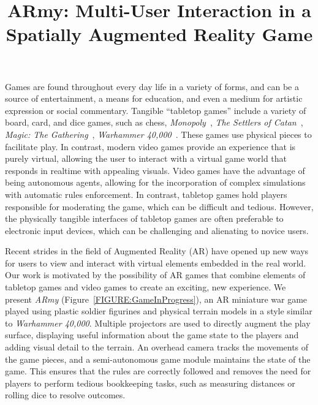 \documentclass[review]{vgtc}                 %
\title{ARmy: Multi-User Interaction in a Spatially Augmented Reality Game}
\begin{document}


\maketitle


Games are found throughout every day life in a variety of forms, and
can be a source of entertainment, a means for education, and even a
medium for artistic expression or social commentary.  Tangible
``tabletop games'' include a variety of board, card, and dice games,
such as chess, \emph{Monopoly}~\cite{Monopoly}, \emph{The Settlers of
  Catan}~\cite{Catan}, 
\emph{Magic: The Gathering}~\cite{MTG}, 
\emph{Warhammer 40,000}~\cite{Warhammer40k}.  These
games use physical pieces to facilitate play.  In contrast, modern
video games provide an experience that is purely virtual, allowing the
user to interact with a virtual game world that responds in realtime
with appealing visuals. Video games have the advantage of being autonomous agents, allowing for the incorporation of complex simulations with automatic rules enforcement. In contrast, tabletop games hold players responsible for moderating the game, which can be difficult and tedious. However, the physically tangible interfaces of tabletop games are often preferable to electronic input devices, which can be challenging and alienating to novice users.

Recent strides in the field of Augmented Reality (AR) have opened up
new ways for users to view and interact with virtual elements embedded
in the real world.  Our work is motivated by the possibility of AR
games that combine elements of tabletop games and video games to
create an exciting, new experience.  We present \emph{ARmy}
(Figure~\ref{FIGURE:GameInProgress}), an AR miniature war game played
using plastic soldier figurines and physical terrain models in a style
similar to \emph{Warhammer 40,000}.  Multiple projectors are used to
directly augment the play surface, displaying useful information about
the game state to the players and adding visual detail to the terrain.
An overhead camera tracks the movements of the game pieces, and a
semi-autonomous game module maintains the state of the game. This
ensures that the rules are correctly followed and removes the need for
players to perform tedious bookkeeping tasks, such as measuring
distances or rolling dice to resolve outcomes.
\end{document}
